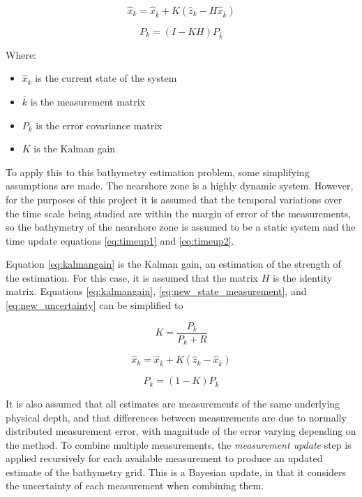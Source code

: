 \begin{equation}\label{eq:new_state_measurement}
    \hat{x}_k = \hat{x}_{\bar{k}} + K(\hat{z}_k - H \hat{x}_{\bar{k}})
\end{equation}

\begin{equation}\label{eq:new_uncertainty}
    P_k = (I - KH)P_{\bar{k}}
\end{equation}

Where:
\begin{itemize}
    \item $\hat{x}_k$ is the current state of the system
    \item $\bar{k}$ is the measurement matrix
    \item $P_k$ is the error covariance matrix
    \item $K$ is the Kalman gain
\end{itemize}

To apply this to this bathymetry estimation problem, some simplifying assumptions are made. The nearshore zone is a highly dynamic system. However, for the purposes of this project it is assumed that the temporal variations over the time scale being studied are within the margin of error of the measurements, so the bathymetry of the nearshore zone is assumed to be a static system and the time update equations \ref{eq:timeup1} and \ref{eq:timeup2}. 

Equation \ref{eq:kalmangain} is the Kalman gain, an estimation of the strength of the estimation. For this case, it is assumed that the matrix $H$ is the identity matrix. Equations \ref{eq:kalmangain}, \ref{eq:new_state_measurement}, and \ref{eq:new_uncertainty} can be simplified to 

$$ K =  \frac{P_k}{P_k + R} $$

$$ \hat{x}_k =  \hat{x}_{\bar{k}} + K(\hat{z}_k -  \hat{x}_{\bar{k}}) $$


$$ P_k = (1 - K) P_{\bar{k}} $$


It is also assumed that all estimates are measurements of the same underlying physical depth, and that differences between measurements are due to normally distributed measurement error, with magnitude of the error varying depending on the method. To combine multiple measurements, the \emph{measurement update} step is applied recursively for each available measurement to produce an updated estimate of the bathymetry grid. This is a Bayesian update, in that it considers the uncertainty of each measurement when combining them. 

